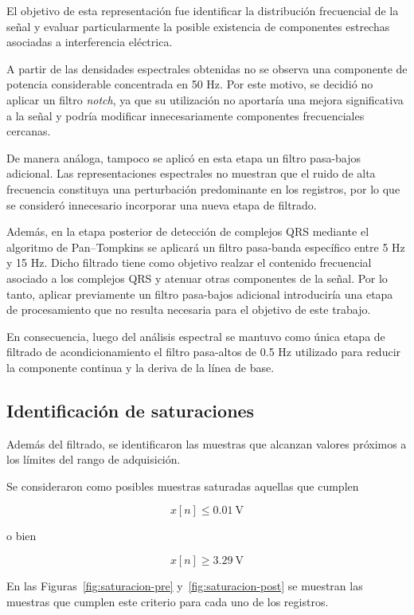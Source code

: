 \documentclass[12pt,a4paper]{article}
\begin{document}
\FloatBarrier

El objetivo de esta representación fue identificar la distribución frecuencial
de la señal y evaluar particularmente la posible existencia de componentes
estrechas asociadas a interferencia eléctrica.

A partir de las densidades espectrales obtenidas no se observa una componente
de potencia considerable concentrada en 50 Hz. Por este motivo, se decidió no
aplicar un filtro \textit{notch}, ya que su utilización no aportaría una mejora
significativa a la señal y podría modificar innecesariamente componentes
frecuenciales cercanas.

De manera análoga, tampoco se aplicó en esta etapa un filtro pasa-bajos
adicional. Las representaciones espectrales no muestran que el ruido de alta
frecuencia constituya una perturbación predominante en los registros, por lo
que se consideró innecesario incorporar una nueva etapa de filtrado.

Además, en la etapa posterior de detección de complejos QRS mediante el
algoritmo de Pan--Tompkins se aplicará un filtro pasa-banda específico entre
5 Hz y 15 Hz. Dicho filtrado tiene como objetivo realzar el contenido
frecuencial asociado a los complejos QRS y atenuar otras componentes de la
señal. Por lo tanto, aplicar previamente un filtro pasa-bajos adicional
introduciría una etapa de procesamiento que no resulta necesaria para el
objetivo de este trabajo.

En consecuencia, luego del análisis espectral se mantuvo como única etapa de
filtrado de acondicionamiento el filtro pasa-altos de 0.5 Hz utilizado para
reducir la componente continua y la deriva de la línea de base.

\subsection{Identificación de saturaciones}

Además del filtrado, se identificaron las muestras que alcanzan valores
próximos a los límites del rango de adquisición.

Se consideraron como posibles muestras saturadas aquellas que cumplen

\[
x[n] \leq 0.01~\mathrm{V}
\]

o bien

\[
x[n] \geq 3.29~\mathrm{V}
\]

En las Figuras~\ref{fig:saturacion-pre} y~\ref{fig:saturacion-post} se muestran
las muestras que cumplen este criterio para cada uno de los registros.
\end{document}
